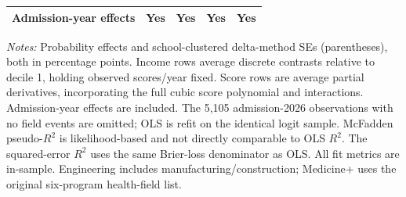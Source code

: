 \begin{table}[!htbp]
\begin{tabular}{lrrrr}
Admission-year effects & Yes & Yes & Yes & Yes \\
\hline\hline\end{tabular}
\begin{minipage}{0.98\textwidth}\footnotesize
\textit{Notes:} Probability effects and school-clustered delta-method SEs (parentheses), both in percentage points. Income rows average discrete contrasts relative to decile 1, holding observed scores/year fixed. Score rows are average partial derivatives, incorporating the full cubic score polynomial and interactions. Admission-year effects are included. The 5,105 admission-2026 observations with no field events are omitted; OLS is refit on the identical logit sample. McFadden pseudo-$R^2$ is likelihood-based and not directly comparable to OLS $R^2$. The squared-error $R^2$ uses the same Brier-loss denominator as OLS. All fit metrics are in-sample. Engineering includes manufacturing/construction; Medicine+ uses the original six-program health-field list.
\end{minipage}
\end{table}
